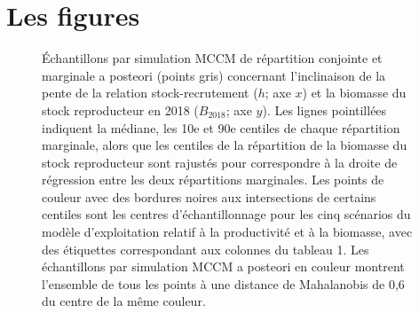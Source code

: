 \documentclass[11pt]{book}
\begin{document}
\hypertarget{les-figures}{%
\section{Les figures}\label{les-figures}}
\begin{figure}[htb]

{\centering {} 

}

\caption{Échantillons par simulation MCCM de répartition conjointe et marginale a posteori (points gris) concernant l’inclinaison de la pente de la relation stock-recrutement ($h$; axe $x$) et la biomasse du stock reproducteur en 2018 ($B_{2018}$; axe $y$). Les lignes pointillées indiquent la médiane, les 10e et 90e centiles de chaque répartition marginale, alors que les centiles de la répartition de la biomasse du stock reproducteur sont rajustés pour correspondre à la droite de régression entre les deux répartitions marginales. Les points de couleur avec des bordures noires aux intersections de certains centiles sont les centres d’échantillonnage pour les cinq scénarios du modèle d’exploitation relatif à la productivité et à la biomasse, avec des étiquettes correspondant aux colonnes du tableau 1. Les échantillons par simulation MCCM a posteori en couleur montrent l’ensemble de tous les points à une distance de Mahalanobis de 0,6 du centre de la même couleur.}\label{fig:unnamed-chunk-17}
\end{figure}
\end{document}
